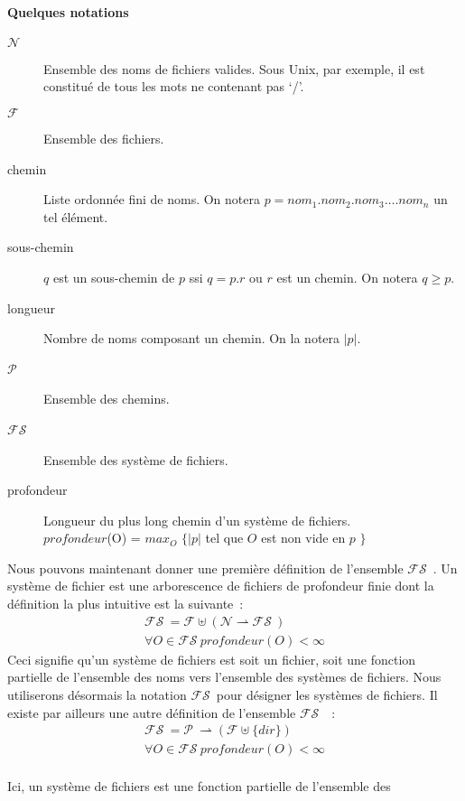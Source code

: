 \documentclass[11pt]{report}
\newcommand{\fs}{\ensuremath{\mathcal{FS}}}
\newcommand{\path}{\ensuremath{\mathcal{P}}}
\begin{document}
\paragraph{Quelques notations\\}
\begin{description}
\item [$\mathcal{N}$] Ensemble des noms de fichiers valides. Sous Unix, par 
exemple, il est constitu\'e de tous les mots ne contenant pas `/'.
\item [$\mathcal{F}$] Ensemble des fichiers.
\item [chemin] Liste ordonn\'ee fini de noms. On notera
  $p = \mathit{nom}_1.\mathit{nom}_2.\mathit{nom}_3\ldots.\mathit{nom}_n$
  un tel \'el\'ement.
\item [sous-chemin] $q$ est un sous-chemin de $p$ ssi $q = p.r$ ou $r$ est un
  chemin.
On notera $q \geq p$.
\item [longueur] Nombre de noms composant un chemin.
On la notera $|p|$.
\item [\path\ ] Ensemble des chemins.
\item [\fs\ ] Ensemble des syst\`eme de fichiers.
\item [profondeur] Longueur du plus long chemin d'un syst\`eme de fichiers.\\
$\mathit{profondeur}$(O) = $max_{O}$ $\{|p|$ tel que $O$ est non vide en $p$ $\}$  
\end{description}
Nous pouvons maintenant donner une premi\`ere d\'efinition de l'ensemble \fs\ .
Un syst\`eme de fichier est une arborescence de fichiers de profondeur finie dont la d\'efinition la plus intuitive est la suivante~:
\[
\begin{array}{l}
\fs\ = \mathcal{F} \uplus (\mathcal{N} \rightharpoonup \fs\ )\\
\forall O \in \fs\ \mathit{profondeur}(O) < \infty
\end{array}
\] 
Ceci signifie qu'un syst\`eme de fichiers est soit un fichier, soit une fonction 
partielle de l'ensemble des noms vers l'ensemble des syst\`emes de fichiers.
Nous utiliserons d\'esormais la notation \fs\ pour d\'esigner les syst\`emes de fichiers.
Il existe par ailleurs une autre d\'efinition de l'ensemble \fs\ ~: 
\[
\begin{array}{l}
\fs\ = \path\ \rightharpoonup (\mathcal{F} \uplus \{dir\})\\
\forall O \in \fs\ \mathit{profondeur}(O) < \infty
\end{array}
\]\\
Ici, un syst\`eme de fichiers est une fonction partielle de l'ensemble des
\end{document}
